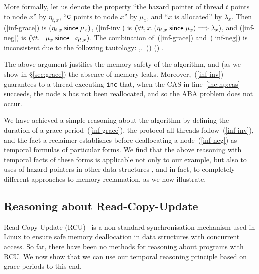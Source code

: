 More formally, let us denote the property ``the hazard pointer of thread $t$
points to node $x$'' by $\eta_{t,x}$, ``$\texttt{C}$ points to node $x$'' by $\mu_x$, and
``$x$ is allocated'' by $\lambda_x$. Then (\ref{inf-grace}) is $(\eta_{t, x} \;\mathsf{since}\;
\mu_x)$, (\ref{inf-inv}) is $(\forall t, x.\, (\eta_{t, x} \;\mathsf{since}\; \mu_x) {\implies}
\lambda_x)$, and (\ref{inf-neg}) is $(\forall t.\, \neg \mu_x \;\mathsf{since}\; \neg \eta_{t,x})$. The
combination of~(\ref{inf-grace}) and~(\ref{inf-neg}) is inconsistent due to the
following tautology: %
\be\label{incons}
\forall \eta,\mu.\,
(\eta \since \mu) \wedge (\neg \mu \since \neg \eta) \implies \false.
\ee

The above argument justifies the memory safety of the algorithm, and (as we show
in \S\ref{sec:grace}) the absence of memory leaks. Moreover,~(\ref{inf-inv})
guarantees to a thread executing {\tt inc} that, when the CAS in
line~\ref{inc:hp:cas} succeeds, the node {\tt s} has not been reallocated, and
so the ABA problem does not occur.

We have achieved a simple reasoning about the algorithm by defining the duration
of a grace period~(\ref{inf-grace}), the protocol all threads
follow~(\ref{inf-inv}), and the fact a reclaimer establishes before deallocating
a node~(\ref{inf-neg}) as temporal formulas of particular forms. We find that
the above reasoning with temporal facts of these forms is applicable not only to
our example, but also to uses of hazard pointers in other data structures
\tra{\ref{sec:ProofsHazard}}{\nhazard}, and in fact, to completely different
approaches to memory reclamation, as we now illustrate.



\subsection{Reasoning about Read-Copy-Update\label{sec:rcu-prelim}}

Read-Copy-Update (RCU)~\cite{rcu-thesis} is a non-standard synchronisation
mechanism used in Linux to ensure safe memory deallocation in data structures
with concurrent access. So far, there have been no methods for reasoning about
programs with RCU. We now show that we can use our temporal reasoning principle
based on grace periods to this end.







